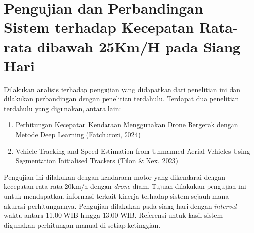 \section{Pengujian dan Perbandingan Sistem terhadap Kecepatan Rata-rata dibawah 25Km/H pada Siang Hari}
Dilakukan analisis terhadap pengujian yang didapatkan dari penelitian ini dan dilakukan perbandingan dengan penelitian terdahulu. Terdapat dua penelitian terdahulu yang digunakan, antara lain:
\begin{enumerate}[nolistsep]
  \item Perhitungan Kecepatan Kendaraan Menggunakan Drone Bergerak dengan Metode Deep Learning (Fatchurozi, 2024) \\
  \item Vehicle Tracking and Speed Estimation from Unmanned Aerial Vehicles Using Segmentation Initialised Trackers (Tilon \& Nex, 2023) \\
\end{enumerate}
\vspace{-5pt}
Pengujian ini dilakukan dengan kendaraan motor yang dikendarai dengan kecepatan rata-rata 20km/h dengan \emph{drone} diam. Tujuan dilakukan pengujian ini untuk mendapatkan informasi terkait kinerja terhadap sistem sejauh mana akurasi perhitungannya. Pengujian dilakukan pada siang hari dengan \emph{interval} waktu antara 11.00 WIB hingga 13.00 WIB. Referensi untuk hasil sistem digunakan perhitungan manual di setiap ketinggian. 

